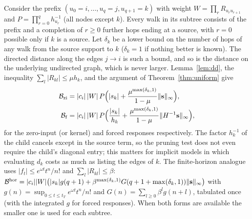 \documentclass[aps,pra,superscriptaddress,floatfix,longbibliography,twocolumn]{revtex4-2}
\newcommand{\bs}{{\bf s}}
\begin{document}
Consider the prefix $(u_0=i,\dots,u_q=j,u_{q+1}=k)$ with weight $W=\prod_rR_{u_ru_{r+1}}$ and $P=\prod_{r=0}^{q}h_{u_r}^{-1}$ (all nodes except $k$). Every walk in its subtree consists of the prefix and a completion of $r\ge0$ further hops ending at a source, with $r=0$ possible only if $k$ is a source. Let $\delta_k$ be a lower bound on the number of hops of any walk from the source support to $k$ ($\delta_k=1$ if nothing better is known). The directed distance along the edges $j\to i$ is such a bound, and so is the distance on the underlying undirected graph, which is never larger. Lemma~\ref{lem:dd}, the inequality $\sum_l|R_{kl}|\le\mu h_k$, and the argument of Theorem~\ref{thm:uniform} give
\begin{align}
\mathcal{B}_{\rm zi}&=|c_i|\,|W|\,P\Big(|s_k|+\frac{\mu^{\max(\delta_k,1)}}{1-\mu}\|\bs\|_\infty\Big),\label{eq:branch_zi}\\
\mathcal{B}_{\rm f}&=|c_i|\,|W|\,P\Big(\frac{|s_k|}{h_k}+\frac{\mu^{\max(\delta_k,1)}}{1-\mu}\|H^{-1}\bs\|_\infty\Big),\label{eq:branch_f}
\end{align}
for the zero-input (or kernel) and forced responses respectively. The factor $h_k^{-1}$ of the child cancels except in the source term, so the pruning test does not even require the child's diagonal entry; this matters for implicit models in which evaluating $d_k$ costs as much as listing the edges of $k$. The finite-horizon analogue uses $|f_t|\le e^{\omega t}t^n/n!$ and $\sum_l|R_{kl}|\le\beta$:
$\mathcal{B}^{\rm hor}=|c_i||W|\big(|s_k|g(q+1)+\beta^{\max(\delta_k,1)}G(q+1+\max(\delta_k,1))\|\bs\|_\infty\big)$ with $g(n)=\sup_{0\le t\le t_T}e^{\omega t}t^n/n!$ and $G(n)=\sum_{l\ge0}\beta^lg(n+l)$, tabulated once (with the integrated $g$ for forced responses). When both forms are available the smaller one is used for each subtree.
\end{document}
